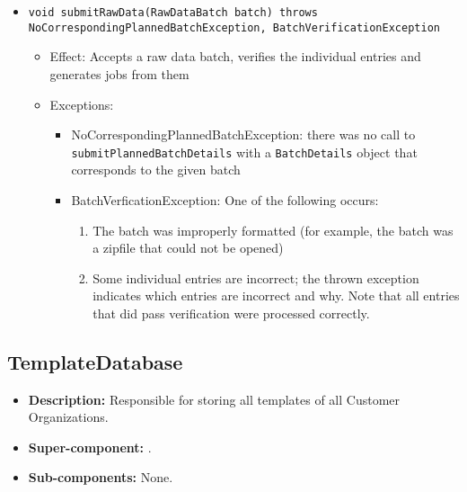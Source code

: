 \begin{itemize}
\begin{itemize}
    	\item \texttt{void submitRawData(RawDataBatch batch) throws NoCorrespondingPlannedBatchException, BatchVerificationException}
    	\begin{itemize}
    		\item Effect: Accepts a raw data batch, verifies the individual entries and generates jobs from them
    		\item Exceptions:
    		\begin{itemize}
    			\item NoCorrespondingPlannedBatchException: there was no call to \texttt{submitPlannedBatchDetails} with a \texttt{BatchDetails} object that corresponds to the given batch
    			\item BatchVerficationException: One of the following occurs:
    			\begin{enumerate}
    				\item The batch was improperly formatted (for example, the batch was a zipfile that could not be opened)
    				\item Some individual entries are incorrect; the thrown exception indicates which entries are incorrect and why. Note that all entries that did pass verification were processed correctly.
    			\end{enumerate} 
    		\end{itemize}
    	\end{itemize}
    \end{itemize}
\end{itemize}

\subsection{TemplateDatabase}
\begin{itemize}
    \item \textbf{Description:} Responsible for storing all templates of all Customer Organizations.
    \item \textbf{Super-component:} .
    \item \textbf{Sub-components:} None.
\end{itemize}

